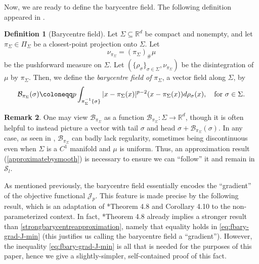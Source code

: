 \documentclass[preprint, reqno]{amsart}
\theoremstyle{definition}
\newtheorem{definition}{Definition}[section]
\newtheorem{remark}[definition]{Remark}
\numberwithin{equation}{section}
\begin{document}
Now, we are ready to define the barycentre field. The following
definition appeared in \cite{Kobayashi24}.
\begin{definition}[Barycentre field]\label{def:barycentrefield}
  Let $\Sigma \subseteq \mathbb{R}^d$ be compact and nonempty, and let
  $\pi_{\Sigma} \in \Pi_{\Sigma}$ be a closest-point projection onto
  $\Sigma$. Let $$\nu_{\pi_{\Sigma}} = (\pi_{\Sigma})_{\#}\mu$$ be the
  pushforward measure on $\Sigma$. Let $(\{\rho_{\sigma}\}_{\sigma \in
    \Sigma}, \nu_{\pi_{\Sigma}})$ be the disintegration of $\mu$ by
  $\pi_{\Sigma}$. Then, we define the \textit{barycentre field of}
  $\pi_{\Sigma}$, a vector field along $\Sigma$, by
  \[
    \mathcal{B}_{\pi_{\Sigma}}(\sigma) \coloneqq p
    \int_{\pi_{\Sigma}^{-1}\{\sigma\}}|x - \pi_{\Sigma}(x)|^{p-2}(x -
    \pi_{\Sigma}(x)) d\rho_{\sigma}(x), \quad \hbox{for $\sigma \in
      \Sigma.$}
  \]
\end{definition}
\begin{remark} \label{rem:bad-regularity}
  One may view $\mathcal B_{\pi_\Sigma}$ as a function
  $\mathcal{B}_{\pi_{\Sigma}} : \Sigma \to \mathbb{R}^d$, though it is
  often helpful to instead picture a vector with tail $\sigma$ and
  head $\sigma + \mathcal B_{\pi_\Sigma}(\sigma)$. In any case, as
  seen in \cite[CE.\ 4.8]{Kobayashi24}, $\mathcal B_{\pi_\Sigma}$ can
  badly lack regularity, sometimes being discontinuous even when
  $\Sigma$ is a $C^1$ manifold and $\mu$ is uniform. Thus, an
  approximation result (\cref{approximatebysmooth}) is necessary to
  ensure we can ``follow'' it and remain in $\mathcal S_l$.
\end{remark}

As mentioned previously, the barycentre field essentially encodes the
``gradient'' of the objective functional $\mathscr{J}_p$. This feature
is made precise by the following result, which is an adaptation of
\cite{Kobayashi24}*{Theorem 4.8 and Corollary 4.10} to the
non-parameterized context. In fact, \cite{Kobayashi24}*{Theorem 4.8}
already implies a stronger result than
\cref{strongbarycentreapproximation}, namely that equality holds in
\cref{eq:fbary-grad-J-min} (this justifies us calling the barycentre
field a ``gradient''). However, the inequality
\eqref{eq:fbary-grad-J-min} is all that is needed for the purposes of
this paper, hence we give a slightly-simpler, self-contained proof of
this fact.
\end{document}
